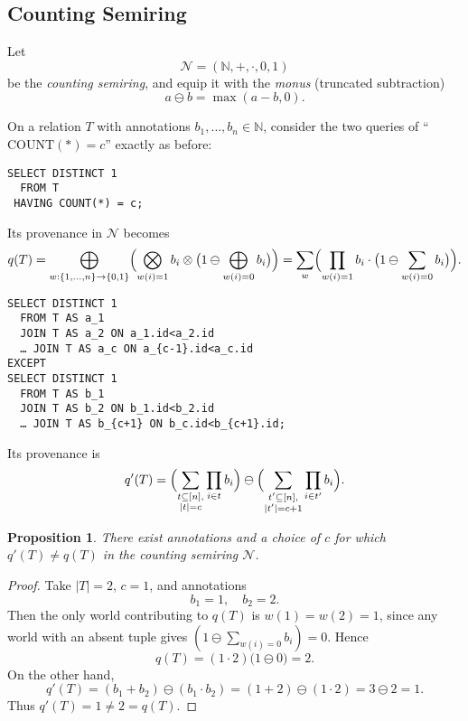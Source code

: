 \documentclass{article}
\newtheorem{proposition}{Proposition}
\begin{document}
\subsection*{Counting Semiring}

Let
\[
  \mathcal{N} = (\mathbb{N},+,\cdot,0,1)
\]
be the \emph{counting semiring}, and equip it with the \emph{monus} (truncated subtraction)
\[
  a \ominus b =\max(a - b,0).
\]

On a relation \(T\) with annotations \(b_1,\dots,b_n\in\mathbb{N}\), consider the two queries of 
“\(\mathrm{COUNT}(*) = c\)” exactly as before:

\begin{verbatim}
SELECT DISTINCT 1
  FROM T
 HAVING COUNT(*) = c;
\end{verbatim}

Its provenance in \(\mathcal{N}\) becomes
\[
  q(T)
  =
  \bigoplus_{w:\{1,\dots,n\}\to\{0,1\}}
    \Bigl(\bigotimes_{w(i)=1}b_i
           \otimes
           \bigl(1\ominus\bigoplus_{w(i)=0}b_i\bigr)
    \Bigr)
  =
  \sum_{w}
    \Bigl(\prod_{w(i)=1}b_i\cdot\bigl(1\ominus\sum_{w(i)=0}b_i\bigr)\Bigr).
\]

\begin{verbatim}
SELECT DISTINCT 1
  FROM T AS a_1
  JOIN T AS a_2 ON a_1.id<a_2.id
  … JOIN T AS a_c ON a_{c-1}.id<a_c.id
EXCEPT
SELECT DISTINCT 1
  FROM T AS b_1
  JOIN T AS b_2 ON b_1.id<b_2.id
  … JOIN T AS b_{c+1} ON b_c.id<b_{c+1}.id;
\end{verbatim}

Its provenance is
\[
  q'(T)
  =
  \Bigl(\sum_{\substack{t\subseteq[n],\\|t|=c}}\prod_{i\in t}b_i\Bigr)
  \ominus
  \Bigl(\sum_{\substack{t'\subseteq[n],\\|t'|=c+1}}\prod_{i\in t'}b_i\Bigr).
\]

\begin{proposition}
There exist annotations and a choice of \(c\) for which
\(q'(T)\neq q(T)\)
in the counting semiring \(\mathcal{N}\).
\end{proposition}

\begin{proof}
Take \(\lvert T\rvert=2\), \(c=1\), and annotations
\[
  b_1 = 1,\quad b_2 = 2.
\]
Then the only world contributing to \(q(T)\) is \(w(1)=w(2)=1\), since any world with an absent tuple gives
\((1\ominus\sum_{w(i)=0}b_i)=0\).  Hence
\[
  q(T)
  = (1\cdot2)\bigl(1\ominus0\bigr)
  = 2.
\]
On the other hand,
\[
  q'(T)
  = (b_1+b_2)\ominus(b_1\cdot b_2)
  = (1+2)\ominus(1\cdot2)
  = 3\ominus2
  = 1.
\]
Thus \(q'(T)=1\neq2=q(T)\).
\end{proof}
\end{document}
